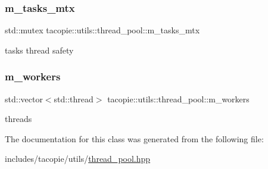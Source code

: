 \subsubsection{\texorpdfstring{m\+\_\+tasks\+\_\+mtx}{m\_tasks\_mtx}}
{\footnotesize\ttfamily std\+::mutex tacopie\+::utils\+::thread\+\_\+pool\+::m\+\_\+tasks\+\_\+mtx\hspace{0.3cm}{\ttfamily [private]}}

tasks thread safety \mbox{\label{classtacopie_1_1utils_1_1thread__pool_a5250ed4fbe845c69e3e28cb7edf4d796}} 
\subsubsection{\texorpdfstring{m\+\_\+workers}{m\_workers}}
{\footnotesize\ttfamily std\+::vector$<$std\+::thread$>$ tacopie\+::utils\+::thread\+\_\+pool\+::m\+\_\+workers\hspace{0.3cm}{\ttfamily [private]}}

threads 

The documentation for this class was generated from the following file\+:\begin{DoxyCompactItemize}
\item 
includes/tacopie/utils/\hyperlink{thread__pool_8hpp}{thread\+\_\+pool.\+hpp}\end{DoxyCompactItemize}
